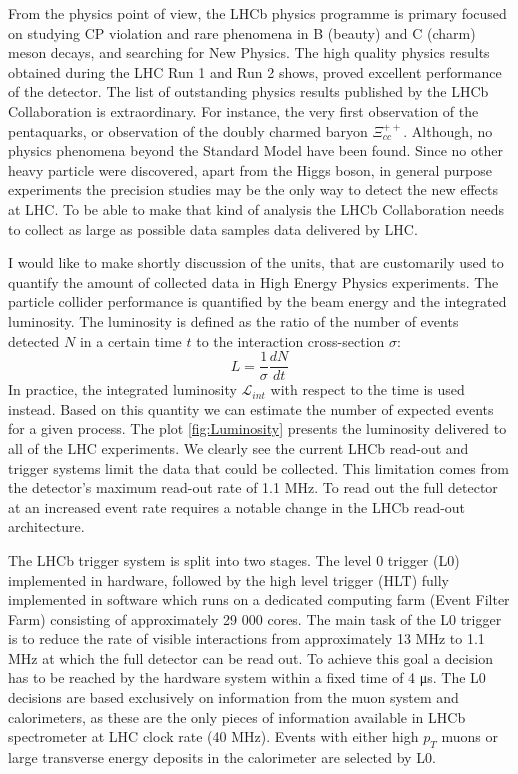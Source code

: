 From the physics point of view, the LHCb physics programme is primary focused on studying CP violation and rare phenomena in B (beauty) and C (charm) meson decays, and searching for New Physics. 
The high quality physics results obtained during the LHC Run 1 and Run 2 shows, proved excellent performance of the detector.
The list of outstanding physics results published by the LHCb Collaboration is extraordinary. 
For instance, the very first observation of the pentaquarks, or observation of the doubly charmed baryon  $\Xi_{cc}^{++}$.   
Although, no physics phenomena beyond the Standard Model have been found. Since no other heavy particle were discovered, apart from the Higgs boson, in general purpose experiments the precision studies may be the only way to detect the new effects at LHC. To be able to make that kind of analysis the LHCb Collaboration needs to collect as large as possible data samples data delivered by LHC. 

I would like to make shortly discussion of the units, that are customarily used to quantify the amount of collected data in High Energy Physics experiments. 
The particle collider performance is quantified by the beam energy and the integrated luminosity. The luminosity is defined as  the ratio of the  number of events detected $N$ in a certain time $t$ to the interaction cross-section $\sigma$:  
\begin{equation}
    L = \frac{1}{\sigma} \frac{dN}{dt}
\end{equation}
In practice, the integrated luminosity $\mathcal{L}_{int}$ with respect to the time is used instead. Based on this quantity we can estimate the number of expected events for a given process. The plot \ref{fig:Luminosity} presents the luminosity delivered to all of the LHC experiments. We clearly see the current LHCb read-out and trigger systems limit the data that could be collected. This limitation comes from the detector's maximum read-out rate of 1.1 MHz. To read out the full detector at an increased event rate requires a notable change in the LHCb read-out architecture.  

The LHCb trigger system is split into two stages. The level 0 trigger (L0) implemented in hardware, followed by the high level trigger (HLT) fully implemented in software which runs on a dedicated computing farm (Event Filter Farm) consisting of approximately 29 000 cores. 
The main task of the L0 trigger is to reduce the rate of visible interactions  from approximately 13 MHz to 1.1 MHz at which the full detector can be read out.  To achieve this goal a decision has to be reached by the hardware system within a fixed time of 4 μs. The L0 decisions are based exclusively on information from the muon system and calorimeters,  as these are the only pieces of information available in LHCb spectrometer at LHC clock  rate (40 MHz). Events  with  either  high $p_T$ muons  or  large  transverse  energy  deposits  in  the calorimeter are selected by L0.


